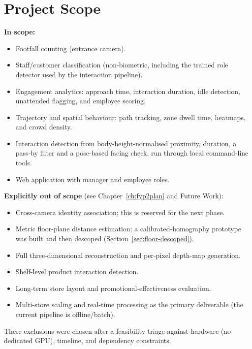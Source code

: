 \section{Project Scope}
\textbf{In scope:}
\begin{itemize}
\item Footfall counting (entrance camera).
\item Staff/customer classification (non-biometric, including the trained role detector used by the interaction pipeline).
\item Engagement analytics: approach time, interaction duration, idle detection, unattended flagging, and employee scoring.
\item Trajectory and spatial behaviour: path tracking, zone dwell time, heatmaps, and crowd density.
\item Interaction detection from body-height-normalised proximity, duration, a pass-by filter and a pose-based facing check, run through local command-line tools.
\item Web application with manager and employee roles.
\end{itemize}
\textbf{Explicitly out of scope} (see Chapter~\ref{ch:fyp2plan} and Future Work):
\begin{itemize}
\item Cross-camera identity association; this is reserved for the next phase.
\item Metric floor-plane distance estimation; a calibrated-homography prototype was built and then descoped (Section~\ref{sec:floor-descoped}).
\item Full three-dimensional reconstruction and per-pixel depth-map generation.
\item Shelf-level product interaction detection.
\item Long-term store layout and promotional-effectiveness evaluation.
\item Multi-store scaling and real-time processing as the primary deliverable (the current pipeline is offline/batch).
\end{itemize}
These exclusions were chosen after a feasibility triage against hardware (no dedicated GPU), timeline, and dependency constraints.

